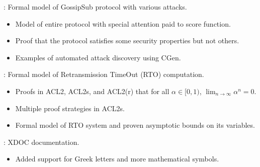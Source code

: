 \begin{frame}

\implibtitle

:
Formal model of GossipSub protocol with various attacks.
\begin{itemize}
\item Model of entire protocol with special attention paid to score function.
\item Proof that the protocol satisfies some security properties but not others.
\item Examples of automated attack discovery using CGen.
\end{itemize}

\end{frame}


\begin{frame}

\implibtitle

:
Formal model of Retransmission TimeOut (RTO) computation.
\begin{itemize}
\item Proofs in ACL2, ACL2s, and ACL2(r) that for all $\alpha \in [0, 1)$, 
$\lim_{n\to\infty}\alpha^n = 0$.
\item Multiple proof strategies in ACL2s.
\item Formal model of RTO system and proven asymptotic bounds on its variables.
\end{itemize}

\end{frame}


\begin{frame}

\implibtitle

:
XDOC documentation.
\begin{itemize}
\item Added support for Greek letters and more mathematical symbols.
\end{itemize}

\end{frame}



